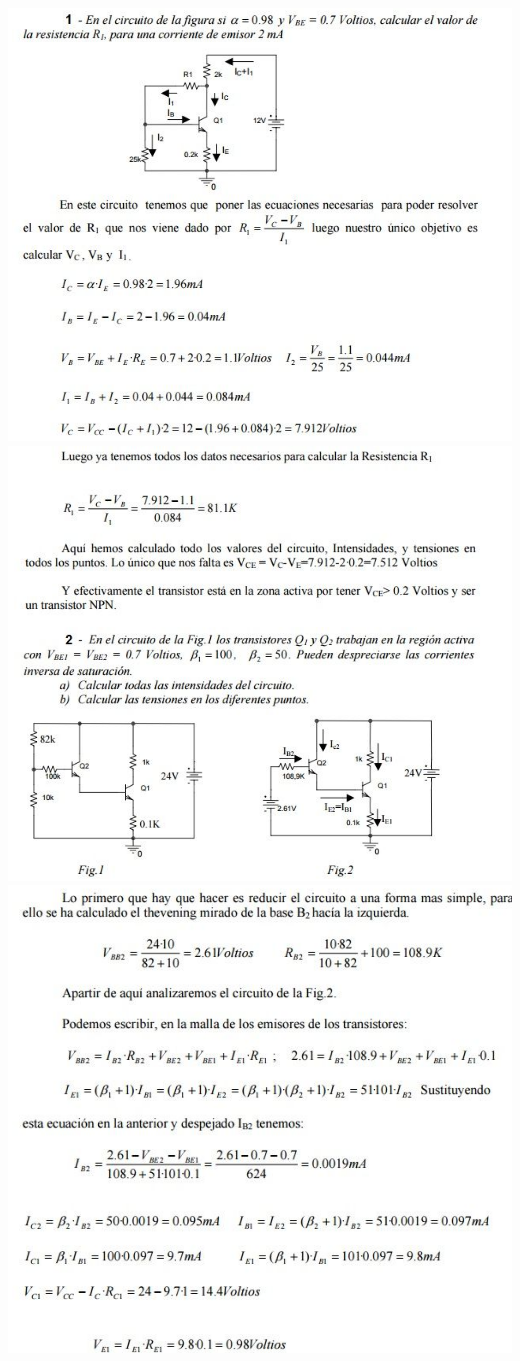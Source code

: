 \documentclass[10pt,a4paper]{article}
\begin{document}
\begin{center}
\includegraphics[scale=0.8]{10.png}
\includegraphics[scale=0.8]{11.png}
\includegraphics[scale=0.8]{12.png}

\end{center}
\end{document}
